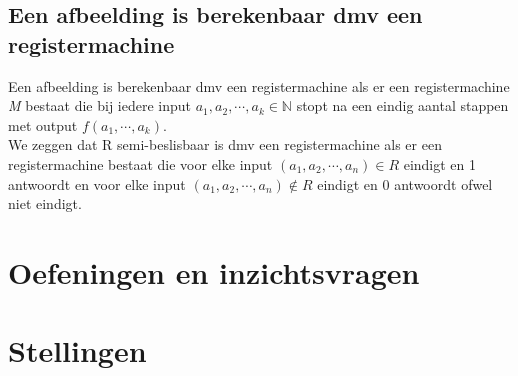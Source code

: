\documentclass[11pt, a4paper]{article}
\begin{document}
\subsection*{Een afbeelding is berekenbaar dmv een registermachine}
Een afbeelding is berekenbaar dmv een registermachine als er een registermachine \textit{M} bestaat die bij iedere input $a_1, a_2, \cdots, a_k \in \mathbb{N}$ stopt na een eindig aantal stappen met output $f(a_1, \cdots, a_k)$.\\
We zeggen dat R semi-beslisbaar is dmv een registermachine als er een registermachine bestaat die voor elke input $(a_1, a_2, \cdots, a_n) \in \textit{R}$ eindigt en 1 antwoordt en voor elke input $(a_1, a_2, \cdots, a_n) \notin \textit{R}$ eindigt en 0 antwoordt ofwel niet eindigt.

\section*{Oefeningen en inzichtsvragen}

\section*{Stellingen}
\end{document}

